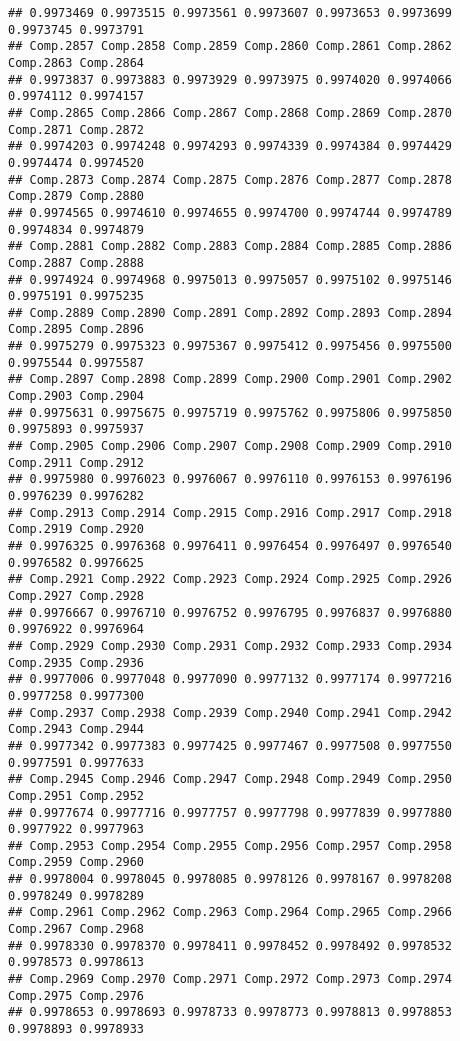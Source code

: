 \documentclass[
]{article}
\begin{document}
\begin{verbatim}
## 0.9973469 0.9973515 0.9973561 0.9973607 0.9973653 0.9973699 0.9973745 0.9973791 
## Comp.2857 Comp.2858 Comp.2859 Comp.2860 Comp.2861 Comp.2862 Comp.2863 Comp.2864 
## 0.9973837 0.9973883 0.9973929 0.9973975 0.9974020 0.9974066 0.9974112 0.9974157 
## Comp.2865 Comp.2866 Comp.2867 Comp.2868 Comp.2869 Comp.2870 Comp.2871 Comp.2872 
## 0.9974203 0.9974248 0.9974293 0.9974339 0.9974384 0.9974429 0.9974474 0.9974520 
## Comp.2873 Comp.2874 Comp.2875 Comp.2876 Comp.2877 Comp.2878 Comp.2879 Comp.2880 
## 0.9974565 0.9974610 0.9974655 0.9974700 0.9974744 0.9974789 0.9974834 0.9974879 
## Comp.2881 Comp.2882 Comp.2883 Comp.2884 Comp.2885 Comp.2886 Comp.2887 Comp.2888 
## 0.9974924 0.9974968 0.9975013 0.9975057 0.9975102 0.9975146 0.9975191 0.9975235 
## Comp.2889 Comp.2890 Comp.2891 Comp.2892 Comp.2893 Comp.2894 Comp.2895 Comp.2896 
## 0.9975279 0.9975323 0.9975367 0.9975412 0.9975456 0.9975500 0.9975544 0.9975587 
## Comp.2897 Comp.2898 Comp.2899 Comp.2900 Comp.2901 Comp.2902 Comp.2903 Comp.2904 
## 0.9975631 0.9975675 0.9975719 0.9975762 0.9975806 0.9975850 0.9975893 0.9975937 
## Comp.2905 Comp.2906 Comp.2907 Comp.2908 Comp.2909 Comp.2910 Comp.2911 Comp.2912 
## 0.9975980 0.9976023 0.9976067 0.9976110 0.9976153 0.9976196 0.9976239 0.9976282 
## Comp.2913 Comp.2914 Comp.2915 Comp.2916 Comp.2917 Comp.2918 Comp.2919 Comp.2920 
## 0.9976325 0.9976368 0.9976411 0.9976454 0.9976497 0.9976540 0.9976582 0.9976625 
## Comp.2921 Comp.2922 Comp.2923 Comp.2924 Comp.2925 Comp.2926 Comp.2927 Comp.2928 
## 0.9976667 0.9976710 0.9976752 0.9976795 0.9976837 0.9976880 0.9976922 0.9976964 
## Comp.2929 Comp.2930 Comp.2931 Comp.2932 Comp.2933 Comp.2934 Comp.2935 Comp.2936 
## 0.9977006 0.9977048 0.9977090 0.9977132 0.9977174 0.9977216 0.9977258 0.9977300 
## Comp.2937 Comp.2938 Comp.2939 Comp.2940 Comp.2941 Comp.2942 Comp.2943 Comp.2944 
## 0.9977342 0.9977383 0.9977425 0.9977467 0.9977508 0.9977550 0.9977591 0.9977633 
## Comp.2945 Comp.2946 Comp.2947 Comp.2948 Comp.2949 Comp.2950 Comp.2951 Comp.2952 
## 0.9977674 0.9977716 0.9977757 0.9977798 0.9977839 0.9977880 0.9977922 0.9977963 
## Comp.2953 Comp.2954 Comp.2955 Comp.2956 Comp.2957 Comp.2958 Comp.2959 Comp.2960 
## 0.9978004 0.9978045 0.9978085 0.9978126 0.9978167 0.9978208 0.9978249 0.9978289 
## Comp.2961 Comp.2962 Comp.2963 Comp.2964 Comp.2965 Comp.2966 Comp.2967 Comp.2968 
## 0.9978330 0.9978370 0.9978411 0.9978452 0.9978492 0.9978532 0.9978573 0.9978613 
## Comp.2969 Comp.2970 Comp.2971 Comp.2972 Comp.2973 Comp.2974 Comp.2975 Comp.2976 
## 0.9978653 0.9978693 0.9978733 0.9978773 0.9978813 0.9978853 0.9978893 0.9978933 

\end{verbatim}
\end{document}
